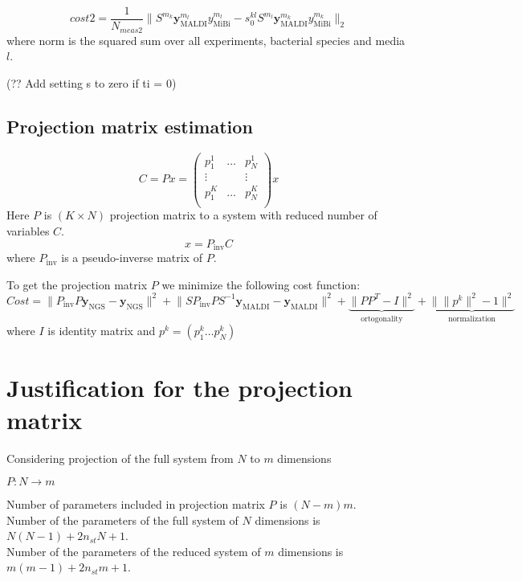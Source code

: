 \documentclass[10pt,A4paper]{article}
\begin{document}
\begin{equation}\boxed{
    cost2 = \frac{1}{N_{meas2}} \Big \lVert S^{m_k} \mathbf{y}^{m_l}_\text{MALDI} y^{m_l}_\text{MiBi} 
     -  s_0^{kl} S^{m_l} \mathbf{y}^{m_k}_\text{MALDI} y^{m_k}_\text{MiBi}  \Big \rVert _2}
\end{equation}
where norm is the squared sum over all experiments, bacterial species and media $l$.

(?? Add setting s to zero if ti = 0)


\subsection{Projection matrix estimation}

\begin{equation}
    C = Px = \begin{pmatrix}
        p^1_1 & \dots & p^1_N  \\
        \vdots &      & \vdots \\
        p^K_1 & \dots & p^K_N  \\
    \end{pmatrix} x
\end{equation}
Here $P$ is $(K \times N)$ projection matrix to a system with reduced number of variables $C$.
\begin{equation}
    x = P_\text{inv} C
\end{equation}
where $P_\text{inv}$ is a pseudo-inverse matrix of $P$.

To get the projection matrix $P$ we minimize the following cost function:
\begin{equation}
    Cost = \lVert P_\text{inv} P \mathbf{y}_\text{NGS} - \mathbf{y}_\text{NGS} \rVert^2 +
           \lVert S P_\text{inv} P S^{-1} \mathbf{y}_\text{MALDI} - \mathbf{y}_\text{MALDI} \rVert^2 +
           \underbrace{\lVert P P^T - I \rVert^2}_\text{ortogonality} +
           \underbrace{\lVert \lVert p^k \rVert^2  - 1\rVert^2}_\text{normalization}
\end{equation}
where $I$ is identity matrix and $p^k = (p^k_1 \dots p^k_N)$

\section{Justification for the projection matrix}
Considering projection of the full system from $N$ to $m$ dimensions

$P: N \rightarrow m$

Number of parameters included in projection matrix $P$ is $(N-m)m$.\\
Number of the parameters of the full system of $N$ dimensions is  $N(N-1) + 2 n_{st} N + 1$.\\
Number of the parameters of the reduced system of $m$ dimensions is  $m(m-1) + 2 n_{st} m + 1$.\\
\end{document}
